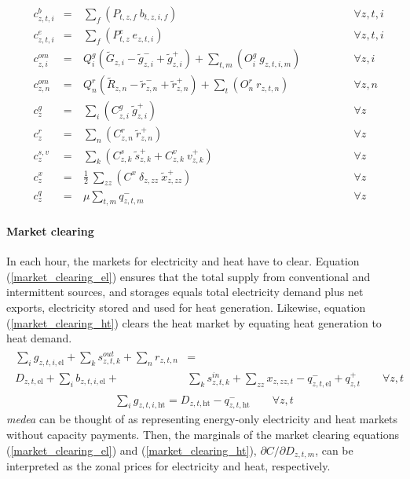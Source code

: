 \documentclass[11pt,a4paper]{article}
\begin{document}
\begin{align}
&c^{b}_{z,t,i}& =&\ \sum_{f} \left( P_{t,z,f} \: b_{t,z,i,f} \right) \qquad \qquad &\forall z,t,i \label{fuel_cost} \\
&c^{e}_{z,t,i}& =&\ \sum_{f} \left( P^{e}_{t,z} \: e_{z,t,i} \right) \qquad \qquad &\forall z,t,i\\
&c^{om}_{z,i}& =&\ Q^{g}_{i} \left(\widetilde{G}_{z,i} - \widetilde{g}^{-}_{z,i} + \widetilde{g}^{+}_{z,i}\right) + \sum_{t,m} \left(O^{g}_{i} \: g_{z,t,i,m}\right) \qquad \qquad &\forall z,i \\
&c^{om}_{z,n}& =&\ Q^{r}_{n} \left(\widetilde{R}_{z,n} - \widetilde{r}^{-}_{z,n} + \widetilde{r}^{+}_{z,n}\right) + \sum_{t} \left(O^{r}_{n} \: r_{z,t,n}\right) \qquad \qquad &\forall z,n \\
&c^{g}_{z}& =&\ \sum_{i} \left( C^{g}_{z,i} \: \widetilde{g}^{+}_{z,i} \right) \qquad \qquad &\forall z\\
&c^{r}_{z}& =&\ \sum_{n} \left( C^{r}_{z,n} \: \widetilde{r}^{+}_{z,n} \right) \qquad \qquad &\forall z\\
&c^{s,v}_{z}& =&\ \sum_{k} \left( C^{s}_{z,k} \: \widetilde{s}^{+}_{z,k} + C^{v}_{z,k} \: v^{+}_{z,k} \right) \qquad \qquad &\forall z\\
&c^{x}_{z}& =&\ \frac{1}{2} \: \sum_{zz} (C^{x} \: \delta_{z,zz} \: \widetilde{x}^{+}_{z,zz}) \qquad \qquad &\forall z \label{transmission_expansion_cost}\\
&c^{q}_{z}& =&\ \mu \sum_{t,m} q^{-}_{z,t,m} \qquad \qquad &\forall z \label{lost_load_cost}
\end{align}

\paragraph{Market clearing}
In each hour, the markets for electricity and heat have to clear.
Equation (\ref{market_clearing_el}) ensures that the total supply from conventional and intermittent sources, and storages equals total electricity demand plus net exports, electricity stored and used for heat generation. 
Likewise, equation (\ref{market_clearing_ht}) clears the heat market by equating heat generation to heat demand.
\begin{align}
\begin{split}
\sum_{i} g_{z,t,i,\text{el}} + \sum_{k} s^{out}_{z,t,k} + \sum_{n} r_{z,t,n} &=  \\ D_{z,t,\text{el}} + \sum_{i} b_{z,t,i,\text{el}} + & \sum_{k} s^{in}_{z,t,k} + \sum_{zz} x_{z,zz,t} - q^{-}_{z,t,\text{el}} + q^{+}_{z,t} \qquad \forall z,t 
\end{split}
\label{market_clearing_el}
\end{align} 
\begin{align}
\sum_{i} g_{z,t,i,\text{ht}} = D_{z,t,\text{ht}} - q^{-}_{z,t,\text{ht}} \qquad \forall z,t \label{market_clearing_ht}
\end{align}
\emph{medea} can be thought of as representing energy-only electricity and heat markets without capacity payments. Then, the marginals of the market clearing equations (\ref{market_clearing_el}) and (\ref{market_clearing_ht}), $\partial C / \partial D_{z,t,m}$, can be interpreted as the zonal prices for electricity and heat, respectively.
\end{document}
